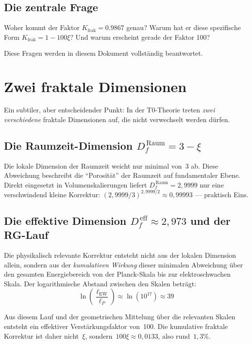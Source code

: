 	\subsection{Die zentrale Frage}
	
	Woher kommt der Faktor $K_{\text{frak}} = 0.9867$ genau? Warum hat er diese spezifische Form $K_{\text{frak}} = 1 - 100\xi$? Und warum erscheint gerade der Faktor 100?
	
	Diese Fragen werden in diesem Dokument vollständig beantwortet.
	
	\section{Zwei fraktale Dimensionen}
	
	Ein subtiler, aber entscheidender Punkt: In der T0-Theorie treten \emph{zwei verschiedene} fraktale Dimensionen auf, die nicht verwechselt werden dürfen.
	
	\subsection{Die Raumzeit-Dimension $D_f^{\,\text{Raum}} = 3 - \xi$}
	
	Die lokale Dimension der Raumzeit weicht nur minimal von~3 ab. Diese Abweichung beschreibt die ``Porosität'' der Raumzeit auf fundamentaler Ebene. Direkt eingesetzt in Volumenskalierungen liefert $D_f^{\,\text{Raum}} = 2{,}9999$ nur eine verschwindend kleine Korrektur: $(2{,}9999/3)^{2{,}9999/2} \approx 0{,}99993$ --- praktisch Eins.
	
	\subsection{Die effektive Dimension $D_f^{\,\text{eff}} \approx 2{,}973$ und der RG-Lauf}
	
	Die physikalisch relevante Korrektur entsteht nicht aus der lokalen Dimension allein, sondern aus der \emph{kumulativen Wirkung} dieser minimalen Abweichung über den gesamten Energiebereich von der Planck-Skala bis zur elektroschwachen Skala. Der logarithmische Abstand zwischen den Skalen beträgt:
	\begin{equation}
		\ln\!\left(\frac{\ell_{\text{EW}}}{\ell_P}\right) \approx \ln(10^{17}) \approx 39
	\end{equation}
	
	Aus diesem Lauf und der geometrischen Mittelung über die relevanten Skalen entsteht ein effektiver Verstärkungsfaktor von~100. Die kumulative fraktale Korrektur ist daher nicht~$\xi$, sondern~$100\xi \approx 0{,}0133$, also rund~$1{,}3\%$.
	
